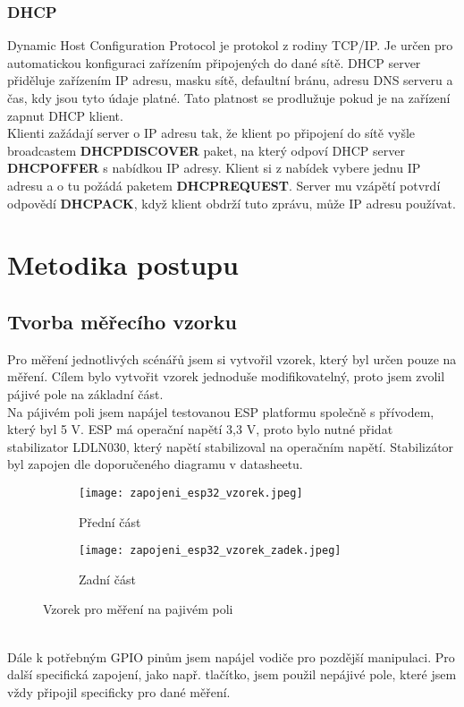\documentclass[a4paper, 12pt]{report}
\begin{document}
			\subsection{DHCP}
			Dynamic Host Configuration Protocol je protokol z rodiny TCP/IP. Je určen pro automatickou konfiguraci zařízením připojených do dané sítě. DHCP server přiděluje zařízením IP adresu, masku sítě, defaultní bránu, adresu DNS serveru a čas, kdy jsou tyto údaje platné. Tato platnost se prodlužuje pokud je na zařízení zapnut DHCP klient.\\
			Klienti zažádají server o IP adresu tak, že klient po připojení do sítě vyšle broadcastem {\bf DHCPDISCOVER} paket, na který odpoví DHCP server {\bf DHCPOFFER} s nabídkou IP adresy. Klient si z nabídek vybere jednu IP adresu a o tu požádá paketem {\bf DHCPREQUEST}. Server mu vzápětí potvrdí odpovědí {\bf DHCPACK}, když klient obdrží tuto zprávu, může IP adresu používat.


	\chapter{Metodika postupu}
		\section{Tvorba měřecího vzorku}
			Pro měření jednotlivých scénářů jsem si vytvořil vzorek, který byl určen pouze na měření. Cílem bylo vytvořit vzorek jednoduše modifikovatelný, proto jsem zvolil pájivé pole na základní část.\\
			Na pájivém poli jsem napájel testovanou ESP platformu společně s přívodem, který byl 5 V. ESP má operační napětí 3,3 V, proto bylo nutné přidat stabilizator LDLN030, který napětí stabilizoval na operačním napětí. Stabilizátor byl zapojen dle doporučeného diagramu v datasheetu.
			\begin{figure}[h!]
				\centering
				\begin{subfigure}[b]{0.4\linewidth}
					\texttt{[image: zapojeni\_esp32\_vzorek.jpeg]}
					\caption{Přední část}
				\end{subfigure}
				\begin{subfigure}[b]{0.4\linewidth}
					\texttt{[image: zapojeni\_esp32\_vzorek\_zadek.jpeg]}
					\caption{Zadní část}
				\end{subfigure}
				\caption{Vzorek pro měření na pajivém poli}
				\label{zapojeni_esp32_vzorek}
			\end{figure}\\
			Dále k potřebným GPIO pinům jsem napájel vodiče pro pozdější manipulaci. Pro další specifická zapojení, jako např. tlačítko, jsem použil nepájivé pole, které jsem vždy připojil specificky pro dané měření.
\end{document}
